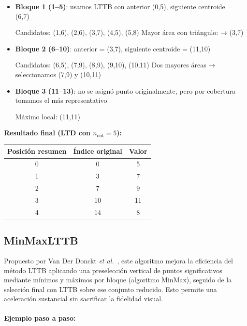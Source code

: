 \begin{itemize}
    \item \textbf{Bloque 1 (1–5)}: usamos LTTB con anterior (0,5), siguiente centroide = (6,7)
    
    Candidatos: (1,6), (2,6), (3,7), (4,5), (5,8)  
    Mayor área con triángulo: → (3,7)
    
    \item \textbf{Bloque 2 (6–10)}: anterior = (3,7), siguiente centroide = (11,10)
    
    Candidatos: (6,5), (7,9), (8,9), (9,10), (10,11)  
    Dos mayores áreas → seleccionamos (7,9) y (10,11)
    
    \item \textbf{Bloque 3 (11–13)}: no se asignó punto originalmente, pero por cobertura tomamos el más representativo
    
    Máximo local: (11,11)
\end{itemize}

\bigskip

\noindent \textbf{Resultado final (LTD con $n_{\text{out}} = 5$):}

\begin{center}
\begin{tabular}{|c|c|c|}
\hline
Posición resumen & Índice original & Valor \\
\hline
0 & 0 & 5 \\
1 & 3 & 7 \\
2 & 7 & 9 \\
3 & 10 & 11 \\
4 & 14 & 8 \\
\hline
\end{tabular}
\end{center}

\subsection{MinMaxLTTB} 
Propuesto por Van Der Donckt {\it et al.}~\cite{vanderdonckt2023minmaxlttb}, este algoritmo mejora la eficiencia del método LTTB aplicando una preselección vertical de puntos significativos mediante mínimos y máximos por bloque (algoritmo MinMax), seguido de la selección final con LTTB sobre ese conjunto reducido. Esto permite una aceleración sustancial sin sacrificar la fidelidad visual.

\paragraph{Ejemplo paso a paso:}

